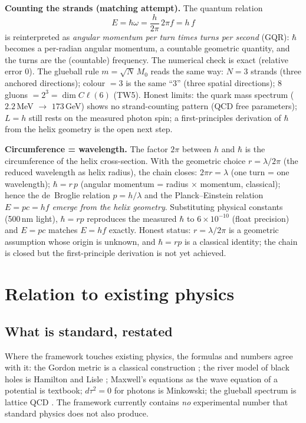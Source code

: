 \documentclass[aps,prd,preprint,superscriptaddress,amsmath,amssymb]{revtex4-2}
\begin{document}
\textbf{Counting the strands (matching attempt).} The quantum relation
\[
E = \hbar\omega = \frac{h}{2\pi}\,2\pi f = h\,f
\]
is reinterpreted as \emph{angular momentum per turn times turns per
second} (GQR): $\hbar$ becomes a per-radian angular momentum, a countable
geometric quantity, and the turns are the (countable) frequency. The
numerical check is exact (relative error $0$). The glueball rule
$m=\sqrt{N}\,M_0$ reads the same way: $N=3$ strands (three anchored
directions); colour $=3$ is the same ``3'' (three spatial directions);
$8$ gluons $= 2^3 = \dim C\ell(6)$ (TW5). Honest limits: the quark mass
spectrum ($2.2$\,MeV $\to$ $173$\,GeV) shows no strand-counting pattern
(QCD free parameters); $L=h$ still rests on the measured photon spin; a
first-principles derivation of $\hbar$ from the helix geometry is the open
next step.

\textbf{Circumference = wavelength.}  The factor $2\pi$ between $h$ and
$\hbar$ is the circumference of the helix cross-section.  With the
geometric choice $r=\lambda/2\pi$ (the reduced wavelength as helix radius),
the chain closes: $2\pi r = \lambda$ (one turn = one wavelength);
$\hbar = r\,p$ (angular momentum = radius $\times$ momentum, classical);
hence the de~Broglie relation $p = h/\lambda$ and the Planck--Einstein
relation $E = pc = hf$ \emph{emerge from the helix geometry}.  Substituting
physical constants (500\,nm light), $\hbar = r p$ reproduces the measured
$\hbar$ to $6\times10^{-10}$ (float precision) and $E = pc$ matches
$E = hf$ exactly.  Honest status: $r=\lambda/2\pi$ is a geometric
assumption whose origin is unknown, and $\hbar = rp$ is a classical
identity; the chain is closed but the first-principle derivation is not
yet achieved.

\section{Relation to existing physics}\label{sec:relation}

\subsection{What is standard, restated}

Where the framework touches existing physics, the formulas and numbers agree
with it: the Gordon metric is a classical construction
\cite{Gordon1923}; the river model of black holes is Hamilton and Lisle
\cite{HamiltonLisle2008}; Maxwell's equations as the wave equation of a
potential is textbook; $d\tau^2=0$ for photons is Minkowski; the glueball
spectrum is lattice QCD \cite{MorningstarPeardon1999,Chen2006}.  The
framework currently contains \emph{no} experimental number that standard
physics does not also produce.
\end{document}
